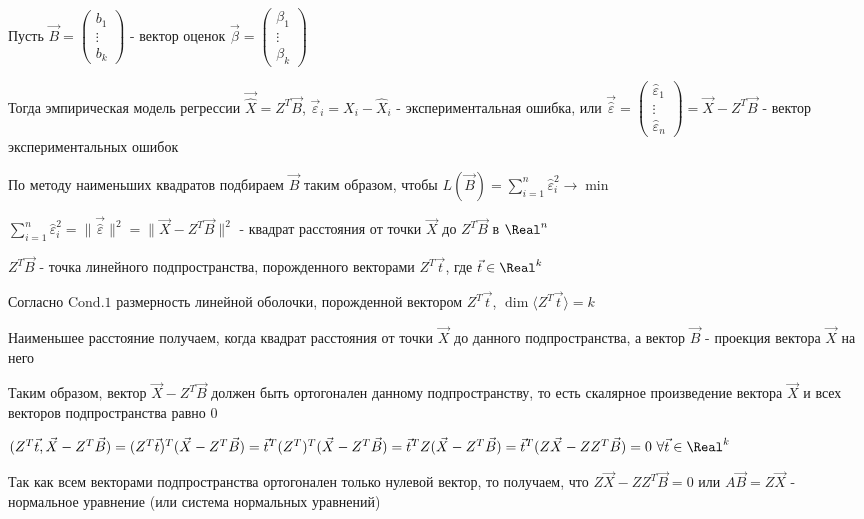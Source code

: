 \begin{enumerate}
    Пусть $\vec B = \begin{pmatrix}b_1 \\ \vdots \\ b_k\end{pmatrix}$ - вектор оценок $\vec \beta = \begin{pmatrix}\beta_1 \\ \vdots \\ \beta_k\end{pmatrix}$

    Тогда эмпирическая модель регрессии $\vec{\hat X} = Z^T \vec B$, 
    $\vec \varepsilon_i = X_i - \hat X_i$ - экспериментальная ошибка, или $\vec {\hat \varepsilon} = \begin{pmatrix}\hat \varepsilon_1 \\ \vdots \\ \hat \varepsilon_n\end{pmatrix} = \vec X - Z^T \vec B$ - вектор экспериментальных ошибок

    По методу наименьших квадратов подбираем $\vec B$ таким образом, чтобы $L(\vec B) = \sum_{i = 1}^n \hat \varepsilon_i^2 \longrightarrow \min$

    $\sum_{i = 1}^n \hat \varepsilon_i^2 = \|\vec{\hat \varepsilon}\|^2 = \| \vec X - Z^T \vec B\|^2$ - квадрат расстояния от точки $\vec X$ до $Z^T \vec B$ в $\Real^n$

    $Z^T \vec B$ - точка линейного подпространства, порожденного векторами $Z^T \vec t$, где $\vec t \in \Real^k$

    \Nota Согласно $\mathrm{Cond. 1}$ размерность линейной оболочки, порожденной вектором $Z^T \vec t$,  $\dim \langle Z^T \vec t \rangle = k$

    Наименьшее расстояние получаем, когда квадрат расстояния от точки $\vec X$ до данного подпространства, а вектор $\vec B$ - проекция вектора $\vec X$ на него

    Таким образом, вектор $\vec X - Z^T \vec B$ должен быть ортогонален данному подпространству, то есть скалярное произведение вектора $\vec X$ и всех векторов подпространства равно 0

    $(Z^T \vec t, \vec X - Z^T \vec B) = (Z^T \vec t)^T (\vec X - Z^T \vec B) = {\vec t}^T (Z^T)^T (\vec X - Z^T \vec B) = {\vec t}^T Z (\vec X - Z^T \vec B) = 
    {\vec t}^T (Z \vec X - Z Z ^T \vec B) = 0 \ \forall \vec t \in \Real^k$

    Так как всем векторами подпространства ортогонален только нулевой вектор, то получаем, что $Z \vec X - Z Z^T \vec B = 0$ или $A \vec B = Z \vec X$ - нормальное уравнение (или система нормальных уравнений)


\end{enumerate}
